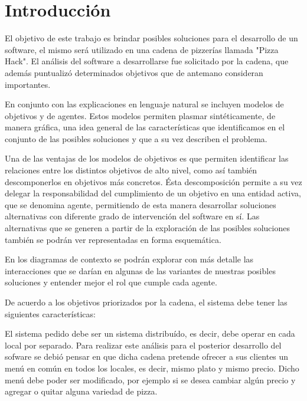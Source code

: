 \documentclass[a4paper,10pt]{article}
\begin{document}
\tableofcontents

\newpage


\section*{Introducci\'on}

El objetivo de este trabajo es brindar posibles soluciones para el desarrollo de un software, el mismo ser\'a utilizado en una cadena de pizzer\'ias llamada "Pizza Hack". El análisis del software a desarrollarse fue solicitado por la cadena, que además puntualizó determinados objetivos que de antemano consideran importantes.


En conjunto con las explicaciones en lenguaje natural se incluyen modelos de objetivos y de agentes. Estos modelos permiten plasmar sintéticamente, de manera gráfica, una idea general de las características que identificamos en el conjunto de las posibles soluciones y que a su vez describen el problema. 

Una de las ventajas de los modelos de objetivos es que permiten identificar las relaciones entre los distintos objetivos de alto nivel, como así también descomponerlos en objetivos más concretos. Ésta descomposición permite a su vez delegar la responsabilidad del cumplimiento de un objetivo en una entidad activa, que se denomina agente, permitiendo de esta manera desarrollar soluciones alternativas con diferente grado de intervención del software en sí. Las alternativas que se generen a partir de la exploración de las posibles soluciones también se podrán ver representadas en forma esquemática. 

En los diagramas de contexto se podrán explorar con más detalle las interacciones que se darían en algunas de las variantes de nuestras posibles soluciones y entender mejor el rol que cumple cada agente.

De acuerdo a los objetivos priorizados por la cadena, el sistema debe tener las siguientes características:


El sistema pedido debe ser un sistema distribu\'ido, es decir, debe operar en cada local por separado. Para realizar este an\'alisis para el posterior desarrollo del sofware se debi\'o pensar en que dicha cadena pretende ofrecer a sus clientes un men\'u en com\'un en todos los locales, es decir, mismo plato y mismo precio. Dicho men\'u debe poder ser modificado, por ejemplo si se desea cambiar alg\'un precio y agregar o quitar alguna variedad de pizza.
\end{document}
